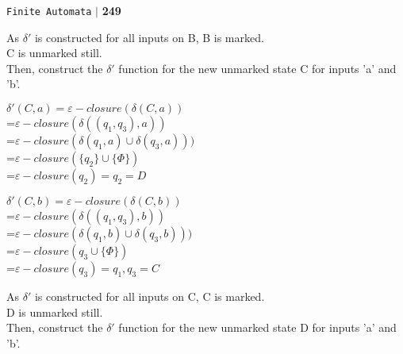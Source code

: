 \documentclass{article}
\begin{document}
\begin{flushright}
 \texttt{Finite Automata} \hspace*{0.1cm}\textbf{$|$} \hspace*{0.1cm} \textbf{249}\hspace*{0.1cm}
\end{flushright}
\vspace*{0.5cm}

As $\delta'$ is constructed for all inputs on B, B is marked.\\
C is unmarked still.\\
Then, construct the $\delta'$ function for the new unmarked state C for inputs 'a' and 'b'.\\
\begin{center}
 $\delta'(C, a) = \varepsilon-closure(\delta (C, a))$ \\
\hspace*{1.7cm} =$ \varepsilon-closure (\delta((q_1, q_3), a))$ \\
\hspace*{2.7cm} =$ \varepsilon-closure (\delta(q_1, a) \cup \delta(q_3, a)))$ \\
\hspace*{1.7cm} =$ \varepsilon-closure (\{q_2\} \cup \{\Phi\})$ \\
\hspace*{1.7cm} =$ \varepsilon-closure(q_2) = {q_2} = D$ \\
\end{center}

\vspace*{0.5cm}
\begin{center}
 $\delta'(C, b) = \varepsilon-closure(\delta (C, b))$ \\
  \hspace*{2cm} =$ \varepsilon-closure (\delta((q_1, q_3), b))$ \\
  \hspace*{3cm} =$ \varepsilon-closure (\delta(q_1, b) \cup \delta(q_3, b)))$ \\
  \hspace*{1.5cm} =$ \varepsilon-closure ({q_3} \cup \{\Phi\})$ \\
  \hspace*{2.3cm} =$ \varepsilon-closure(q_3) = {q_1, q_3} = C$ \\
\end{center}


As $\delta'$ is constructed for all inputs on C, C is marked.\\
D is unmarked still.\\
Then, construct the $\delta'$ function for the new unmarked state D for inputs 'a' and 'b'.\\
\end{document}
